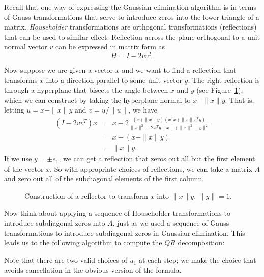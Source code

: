 \documentclass[12pt, leqno]{article}
\begin{document}
Recall that one way of expressing the Gaussian elimination algorithm
is in terms of Gauss transformations that serve to introduce zeros
into the lower triangle of a matrix.  {\em Householder} transformations
are orthogonal transformations (reflections) that can be used to similar
effect.  Reflection across the plane orthogonal to a unit normal
vector $v$ can be expressed in matrix form as
\[
  H = I-2 vv^T.
\]

Now suppose we are given a vector $x$ and we want to find a reflection
that transforms $x$ into a direction parallel to some unit vector $y$.
The right reflection is through a hyperplane that bisects the angle
between $x$ and $y$ (see Figure~\ref{fig1}), which we can construct
by taking the hyperplane normal to $x-\|x\|y$.  That is,
letting $u = x - \|x\|y$ and $v = u/\|u\|$, we have
\begin{align*}
  (I-2vv^T)x
  & = x - 2\frac{(x+\|x\|y)(x^T x + \|x\| x^T y)}{\|x\|^2 + 2 x^T y \|x\| + \|x\|^2 \|y\|^2} \\
  & = x - (x-\|x\|y) \\
  & = \|x\|y.
\end{align*}
If we use $y = \pm e_1$, we can get a reflection that zeros out all but the
first element of the vector $x$.  So with appropriate choices of reflections,
we can take a matrix $A$ and zero out all of the subdiagonal elements
of the first column.

\begin{figure}
\begin{center}
\end{center}
\caption{Construction of a reflector to transform $x$ into $\|x\|y$,
         $\|y\| = 1$.}
\label{fig1}
\end{figure}

Now think about applying a sequence of Householder transformations to
introduce subdiagonal zeros into $A$, just as we used a sequence of Gauss
transformations to introduce subdiagonal zeros in Gaussian elimination.
This leads us to the following algorithm to compute the $QR$
decomposition:

Note that there are two valid choices of $u_1$ at each step;
we make the choice that avoids cancellation in the obvious version
of the formula.
\end{document}
